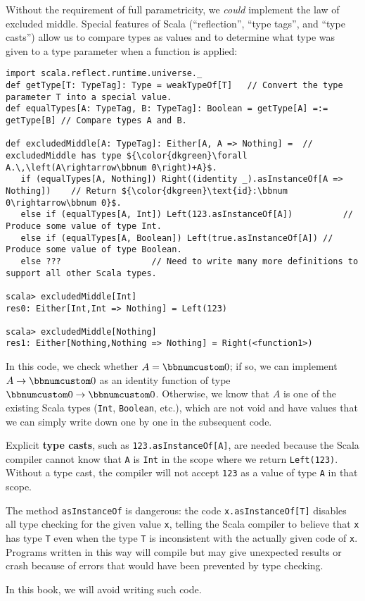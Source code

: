 Without the requirement of full parametricity, we \emph{could} implement
the law of excluded middle. Special
features of Scala (\textsf{``}reflection\textsf{''}, \textsf{``}type tags\textsf{''}, and \textsf{``}type
casts\textsf{''}) allow us to compare types as values and to determine what
type was given to a type parameter when a function is applied:
\begin{lstlisting}[mathescape=true]
import scala.reflect.runtime.universe._
def getType[T: TypeTag]: Type = weakTypeOf[T]   // Convert the type parameter T into a special value.
def equalTypes[A: TypeTag, B: TypeTag]: Boolean = getType[A] =:= getType[B] // Compare types A and B.

def excludedMiddle[A: TypeTag]: Either[A, A => Nothing] =  // excludedMiddle has type ${\color{dkgreen}\forall A.\,\left(A\rightarrow\bbnum 0\right)+A}$.
   if (equalTypes[A, Nothing]) Right((identity _).asInstanceOf[A => Nothing])    // Return ${\color{dkgreen}\text{id}:\bbnum 0\rightarrow\bbnum 0}$.
   else if (equalTypes[A, Int]) Left(123.asInstanceOf[A])          // Produce some value of type Int.
   else if (equalTypes[A, Boolean]) Left(true.asInstanceOf[A]) // Produce some value of type Boolean.
   else ???                  // Need to write many more definitions to support all other Scala types.

scala> excludedMiddle[Int]
res0: Either[Int,Int => Nothing] = Left(123)

scala> excludedMiddle[Nothing]
res1: Either[Nothing,Nothing => Nothing] = Right(<function1>) 
\end{lstlisting}
In this code, we check whether $A=\bbnum 0$; if so, we can implement
$A\rightarrow\bbnum 0$ as an identity function of type $\bbnum 0\rightarrow\bbnum 0$.
Otherwise, we know that $A$ is one of the existing Scala types (\lstinline!Int!,
\lstinline!Boolean!, etc.), which are not void and have values that
we can simply write down one by one in the subsequent code. 

Explicit \textbf{type casts}, such as \lstinline!123.asInstanceOf[A]!,
are needed because the Scala compiler cannot know that \lstinline!A!
is \lstinline!Int! in the scope where we return \lstinline!Left(123)!.
Without a type cast, the compiler will not accept \lstinline!123!
as a value of type \lstinline!A! in that scope.

The method \lstinline!asInstanceOf! is dangerous: the code \lstinline!x.asInstanceOf[T]!
disables all type checking for the given value \lstinline!x!, telling
the Scala compiler to believe that \lstinline!x! has type \lstinline!T!
even when the type \lstinline!T! is inconsistent with the actually
given code of \lstinline!x!. Programs written in this way will compile
but may give unexpected results or crash because of errors that would
have been prevented by type checking. %
\begin{comment}
It is rare that a Scala program truly requires type casts or explicit
comparisons of type parameters. 
\end{comment}
In this book, we will avoid writing such code.

